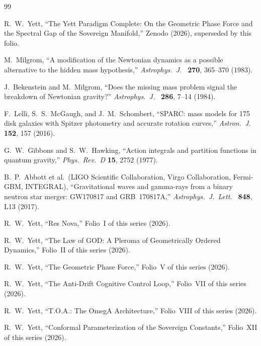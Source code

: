 \documentclass{alienfolio}
\begin{document}
\begin{thebibliography}{99}

 R.~W.~Yett, ``The Yett Paradigm Complete: On the
Geometric Phase Force and the Spectral Gap of the Sovereign Manifold,''
Zenodo  (2026), superseded by this folio.

 M.~Milgrom, ``A modification of the Newtonian
dynamics as a possible alternative to the hidden mass hypothesis,''
\emph{Astrophys.\ J.\ } \textbf{270}, 365--370 (1983).

 J.~Bekenstein and M.~Milgrom, ``Does the
missing mass problem signal the breakdown of Newtonian gravity?''
\emph{Astrophys.\ J.\ } \textbf{286}, 7--14 (1984).

 F.~Lelli, S.~S.~McGaugh, and J.~M.~Schombert,
``SPARC: mass models for 175 disk galaxies with Spitzer photometry
and accurate rotation curves,'' \emph{Astron.\ J.\ } \textbf{152}, 157
(2016).

 G.~W.~Gibbons and S.~W.~Hawking, ``Action integrals and
partition functions in quantum gravity,'' \emph{Phys.\ Rev.\ D}
\textbf{15}, 2752 (1977).

 B.~P.~Abbott et al.\ (LIGO Scientific Collaboration,
Virgo Collaboration, Fermi-GBM, INTEGRAL), ``Gravitational waves and
gamma-rays from a binary neutron star merger: GW170817 and
GRB~170817A,'' \emph{Astrophys.\ J.\ Lett.\ } \textbf{848}, L13 (2017).

 R.~W.~Yett, ``Res Nova,'' Folio~I of this series
(2026).

 R.~W.~Yett, ``The Law of GOD: A Pleroma of
Geometrically Ordered Dynamics,'' Folio~II of this series (2026).

 R.~W.~Yett, ``The Geometric Phase Force,'' Folio~V of
this series (2026).

 R.~W.~Yett, ``The Anti-Drift Cognitive Control
Loop,'' Folio~VII of this series (2026).

 R.~W.~Yett, ``T.O.A.: The OmegA Architecture,''
Folio~VIII of this series (2026).

 R.~W.~Yett, ``Conformal Parameterization of the
Sovereign Constants,'' Folio~XII of this series (2026).

\end{thebibliography}
\end{document}
